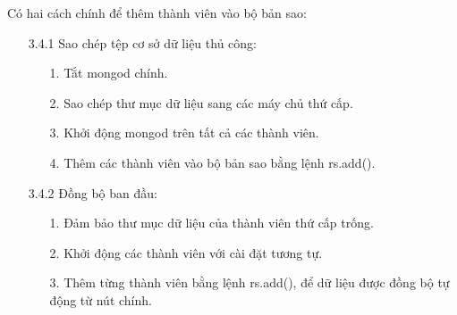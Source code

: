 \begin{enumerate}
\begin{enumerate}
        \hspace{1cm}Có hai cách chính để thêm thành viên vào bộ bản sao:
        \begin{enumerate}
            \item[3.4.1] Sao chép tệp cơ sở dữ liệu thủ công:
            \begin{enumerate}
                \item[1.] Tắt mongod chính.
                \item[2.] Sao chép thư mục dữ liệu sang các máy chủ thứ cấp.
                \item[3.] Khởi động mongod trên tất cả các thành viên.
                \item[4.] Thêm các thành viên vào bộ bản sao bằng lệnh rs.add(). 
            \end{enumerate}
            \item[3.4.2] Đồng bộ ban đầu: 
            \begin{enumerate}
                \item[1.] Đảm bảo thư mục dữ liệu của thành viên thứ cấp trống.
                \item[2.] Khởi động các thành viên với cài đặt tương tự.
                \item[3.] Thêm từng thành viên bằng lệnh rs.add(), để dữ liệu được đồng bộ tự động từ nút chính. 
            \end{enumerate}
        \end{enumerate}
    \end{enumerate}
\end{enumerate}

